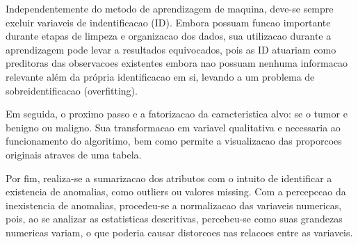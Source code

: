 \documentclass[]{article}
\newenvironment{Shaded}{\begin{snugshade}}{\end{snugshade}}
\newcommand{\KeywordTok}[1]{\textcolor[rgb]{0.13,0.29,0.53}{\textbf{#1}}}
\newcommand{\DataTypeTok}[1]{\textcolor[rgb]{0.13,0.29,0.53}{#1}}
\newcommand{\DecValTok}[1]{\textcolor[rgb]{0.00,0.00,0.81}{#1}}
\newcommand{\StringTok}[1]{\textcolor[rgb]{0.31,0.60,0.02}{#1}}
\newcommand{\CommentTok}[1]{\textcolor[rgb]{0.56,0.35,0.01}{\textit{#1}}}
\newcommand{\OperatorTok}[1]{\textcolor[rgb]{0.81,0.36,0.00}{\textbf{#1}}}
\newcommand{\NormalTok}[1]{#1}
\begin{document}
Independentemente do metodo de aprendizagem de maquina, deve-se sempre
excluir variaveis de indentificacao (ID). Embora possuam funcao
importante durante etapas de limpeza e organizacao dos dados, sua
utilizacao durante a aprendizagem pode levar a resultados equivocados,
pois as ID atuariam como preditoras das observacoes existentes embora
nao possuam nenhuma informacao relevante além da própria identificacao
em si, levando a um problema de sobreidentificacao (overfitting).

Em seguida, o proximo passo e a fatorizacao da caracteristica alvo: se o
tumor e benigno ou maligno. Sua transformacao em variavel qualitativa e
necessaria ao funcionamento do algoritimo, bem como permite a
visualizacao das proporcoes originais atraves de uma tabela.

Por fim, realiza-se a sumarizacao dos atributos com o intuito de
identificar a existencia de anomalias, como outliers ou valores missing.
Com a percepccao da inexistencia de anomalias, procedeu-se a
normalizacao das variaveis numericas, pois, ao se analizar as
estatisticas descritivas, percebeu-se como suas grandezas numericas
variam, o que poderia causar distorcoes nas relacoes entre as variaveis.

\begin{Shaded}
\end{Shaded}
\end{document}
